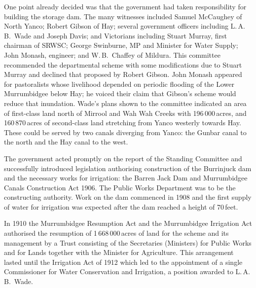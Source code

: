 One point already decided was that the government had taken
responsibility for building the storage dam.  The many witnesses
included Samuel McCaughey of North Yanco; Robert Gibson of Hay;
several government officers including L.\,A.\,B.~Wade and Joseph
Davis; and Victorians including Stuart Murray, first chairman of
SRWSC; George Swinburne, MP and Minister for Water Supply; John
Monash, engineer; and W.\,B.~Chaffey of Mildura. This committee
recommended the departmental scheme with some modifications due to
Stuart Murray and declined that proposed by Robert Gibson.  John
Monash appeared for pastoralists whose livelihood depended on periodic
flooding of the Lower Murrumbidgee below Hay; he voiced their claim
that Gibson's scheme would reduce that inundation.  Wade's plans shown
to the committee indicated an area of first-class land north of
Mirrool and Wah Wah Creeks with 196\,000\,acres, and 160\,870\,acres
of second-class land stretching from Yanco westerly towards Hay. These
could be served by two canals diverging from Yanco: the Gunbar canal
 to the north and the Hay canal  to the
west.

The government acted promptly on the report of the Standing Committee
and successfully introduced legislation authorising construction of
the Burrinjuck dam and the necessary works for irrigation: the Barren
Jack Dam and Murrumbidgee Canals Construction Act
1906.  The Public Works Department was to be the
constructing authority.  Work on the dam commenced in 1908 and the
first supply of water for irrigation was expected after the dam
reached a height of 70\,feet.

In 1910 the Murrumbidgee Resumption Act
 and the Murrumbidgee
Irrigation Act 
authorised the resumption of 1\,668\,000\,acres of land for the scheme
and its management by a Trust consisting of the Secretaries
(Ministers) for Public Works and for Lands together with the Minister
for Agriculture. This arrangement lasted until the Irrigation Act of
1912  which led to the
appointment of a single Commissioner for Water Conservation and
Irrigation, a position awarded to
L.\,A.\,B.~Wade.

